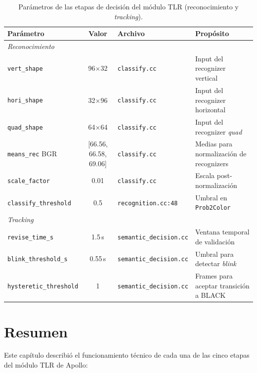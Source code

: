 \begin{table}[H]
\centering
\footnotesize
\begin{tabularx}{\textwidth}{|l|c|l|X|}
\hline
\textbf{Parámetro} & \textbf{Valor} & \textbf{Archivo} & \textbf{Propósito} \\
\hline
\multicolumn{4}{|l|}{\textit{Reconocimiento}} \\
\hline
\texttt{vert\_shape} & 96$\times$32 & \texttt{classify.cc} & Input del recognizer vertical \\
\texttt{hori\_shape} & 32$\times$96 & \texttt{classify.cc} & Input del recognizer horizontal \\
\texttt{quad\_shape} & 64$\times$64 & \texttt{classify.cc} & Input del recognizer \textit{quad} \\
\texttt{means\_rec} BGR & [66.56, 66.58, 69.06] & \texttt{classify.cc} & Medias para normalización de recognizers \\
\texttt{scale\_factor} & 0.01 & \texttt{classify.cc} & Escala post-normalización \\
\texttt{classify\_threshold} & 0.5 & \texttt{recognition.cc:48} & Umbral en \texttt{Prob2Color} \\
\hline
\multicolumn{4}{|l|}{\textit{Tracking}} \\
\hline
\texttt{revise\_time\_s} & 1.5\,s & \texttt{semantic\_decision.cc} & Ventana temporal de validación \\
\texttt{blink\_threshold\_s} & 0.55\,s & \texttt{semantic\_decision.cc} & Umbral para detectar \textit{blink} \\
\texttt{hysteretic\_threshold} & 1 & \texttt{semantic\_decision.cc} & Frames para aceptar transición a BLACK \\
\hline
\end{tabularx}
\caption{Parámetros de las etapas de decisión del módulo TLR (reconocimiento y \textit{tracking}).}
\label{tab:parametros_post}
\end{table}

\section{Resumen}

Este capítulo describió el funcionamiento técnico de cada una de las cinco etapas del módulo TLR de Apollo:

